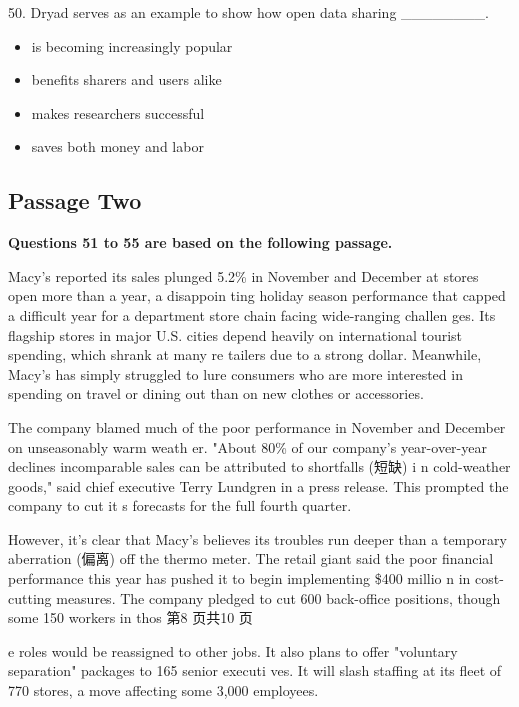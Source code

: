 \documentclass[UTF8,11pt]{ctexart}
\begin{document}
50. Dryad serves as an example to show how open data sharing \_\_\_\_\_\_\_\_.


\begin{itemize}[leftmargin=2em,itemsep=.2em,topsep=.4em]\item[A.] is becoming increasingly popular
\item[B.] benefits sharers and users alike
\item[C.] makes researchers successful
\item[D.] saves both money and labor
\end{itemize}

\subsection*{\textbf{Passage Two}}


\textbf{Questions 51 to 55 are based on the following passage.}


Macy's reported its sales plunged 5.2\% in November and December at stores open more than a year, a disappoin ting holiday season performance that capped a difficult year for a department store chain facing wide-ranging challen ges. Its flagship stores in major U.S. cities depend heavily on international tourist spending, which shrank at many re tailers due to a strong dollar. Meanwhile, Macy's has simply struggled to lure consumers who are more interested in spending on travel or dining out than on new clothes or accessories.


The company blamed much of the poor performance in November and December on unseasonably warm weath er. "About 80\% of our company's year-over-year declines incomparable sales can be attributed to shortfalls (短缺) i n cold-weather goods," said chief executive Terry Lundgren in a press release. This prompted the company to cut it s forecasts for the full fourth quarter.


However, it's clear that Macy's believes its troubles run deeper than a temporary aberration (偏离) off the thermo meter. The retail giant said the poor financial performance this year has pushed it to begin implementing \$400 millio n in cost-cutting measures. The company pledged to cut 600 back-office positions, though some 150 workers in thos 第8 页共10 页


e roles would be reassigned to other jobs. It also plans to offer "voluntary separation" packages to 165 senior executi ves. It will slash staffing at its fleet of 770 stores, a move affecting some 3,000 employees.
\end{document}
